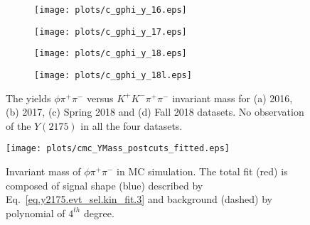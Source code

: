 \begin{figure}[H]
    \centering
    \begin{subfigure}[b]{0.49\textwidth}
        \texttt{[image: plots/c\_gphi\_y\_16.eps]}
        \caption{}
        \label{fig.y2175.xsec_ul.yphi2pi.3.a}
    \end{subfigure}
    \begin{subfigure}[b]{0.49\textwidth}
        \texttt{[image: plots/c\_gphi\_y\_17.eps]}
        \caption{}
        \label{fig.y2175.xsec_ul.yphi2pi.3.b}
    \end{subfigure}
    \begin{subfigure}[b]{0.49\textwidth}
        \texttt{[image: plots/c\_gphi\_y\_18.eps]}
        \caption{}
        \label{fig.y2175.xsec_ul.yphi2pi.3.c}
    \end{subfigure}
    \begin{subfigure}[b]{0.49\textwidth}
        \texttt{[image: plots/c\_gphi\_y\_18l.eps]}
        \caption{}
        \label{fig.y2175.xsec_ul.yphi2pi.3.d}
    \end{subfigure}
    \caption{The yields $\phi \pi^+ \pi^-$ versus $K^{+}K^{-} \pi^+ \pi^-$ invariant mass for (a) 2016, (b) 2017, (c) Spring 2018 and (d) Fall 2018 datasets. No observation of the $Y(2175)$ in all the four datasets.}
    \label{fig.y2175.xsec_ul.yphi2pi.3}
\end{figure}

\begin{figure}[H]
    \centering
    \texttt{[image: plots/cmc\_YMass\_postcuts\_fitted.eps]}
    \caption{\label{fig.y2175.xsec_ul.yphi2pi.4}Invariant mass of $\phi \pi^+ \pi^-$ in MC simulation. The total fit (red) is composed of signal shape (blue) described by Eq.~\ref{eq.y2175.evt_sel.kin_fit.3} and background (dashed) by polynomial of $4^{th}$ degree.}
\end{figure}

